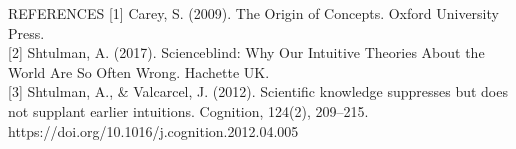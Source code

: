\documentclass[final]{beamer}
\newlength{\colwidth}
\newlength{\widecolwidth}
\begin{document}
\begin{frame}[t]
\begin{columns}[t]
\begin{column}{\widecolwidth}
  \begin{block}{REFERENCES}
  \footnotesize
	[1] Carey, S. (2009). The Origin of Concepts. Oxford University Press.\\[1ex]
	[2] Shtulman, A. (2017). Scienceblind: Why Our Intuitive Theories About the World Are So Often Wrong. Hachette UK.\\[1ex]
	[3] Shtulman, A., \& Valcarcel, J. (2012). Scientific knowledge suppresses but does not supplant earlier intuitions. Cognition, 124(2), 209–215. https://doi.org/10.1016/j.cognition.2012.04.005
  \end{block}

\end{column}
\end{columns}
\end{frame}
\end{document}
